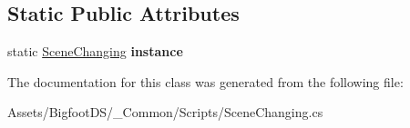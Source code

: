 \subsection*{Static Public Attributes}
\begin{DoxyCompactItemize}
\item 
\mbox{\label{class_bigfoot_d_s_1_1_scene_changing_a646a0875eccb56b4f7cf8f62f541e554}} 
static \mbox{\hyperlink{class_bigfoot_d_s_1_1_scene_changing}{Scene\+Changing}} {\bfseries instance}
\end{DoxyCompactItemize}


The documentation for this class was generated from the following file\+:\begin{DoxyCompactItemize}
\item 
Assets/\+Bigfoot\+D\+S/\+\_\+\+Common/\+Scripts/Scene\+Changing.\+cs\end{DoxyCompactItemize}
